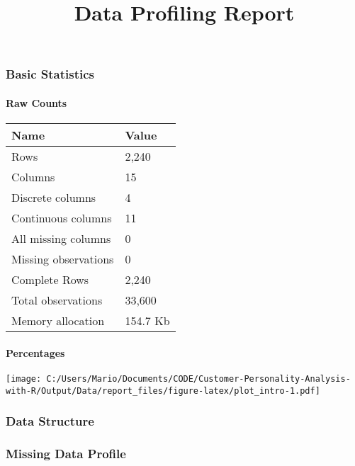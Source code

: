 \documentclass[
]{article}
\title{Data Profiling Report}
\author{}
\date{\vspace{-2.5em}}
\begin{document}
\maketitle

\hypertarget{basic-statistics}{%
\subsubsection{Basic Statistics}\label{basic-statistics}}

\hypertarget{raw-counts}{%
\paragraph{Raw Counts}\label{raw-counts}}

\begin{longtable}[]{@{}ll@{}}
\toprule
Name & Value \\
\midrule
\endhead
Rows & 2,240 \\
Columns & 15 \\
Discrete columns & 4 \\
Continuous columns & 11 \\
All missing columns & 0 \\
Missing observations & 0 \\
Complete Rows & 2,240 \\
Total observations & 33,600 \\
Memory allocation & 154.7 Kb \\
\bottomrule
\end{longtable}

\hypertarget{percentages}{%
\paragraph{Percentages}\label{percentages}}

\texttt{[image: C:/Users/Mario/Documents/CODE/Customer-Personality-Analysis-with-R/Output/Data/report\_files/figure-latex/plot\_intro-1.pdf]}

\hypertarget{data-structure}{%
\subsubsection{Data Structure}\label{data-structure}}

\hypertarget{missing-data-profile}{%
\subsubsection{Missing Data Profile}\label{missing-data-profile}}
\end{document}

